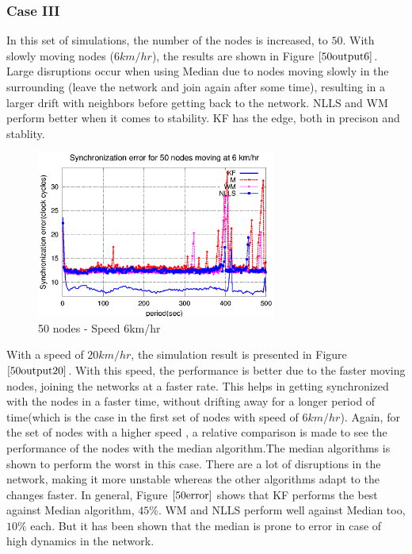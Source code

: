\documentclass[a4paper,10pt]{report}
\begin{document}
\subsubsection{\textbf{Case III}}
In this set of simulations, the number of the nodes is increased, to $50$. With slowly moving nodes ($6km/hr$), the results are shown in Figure $\ref{50output6}$. Large disruptions occur when using Median due to nodes moving slowly in the surrounding (leave the network and join again after some time), resulting in a larger drift with neighbors before getting back to the network. NLLS and WM perform better when it comes to stability. KF has the edge, both in precison and stablity. 
\newline
\begin{figure}
\centering
\includegraphics[width=0.7\textwidth]{50output-s6}
\caption{50 nodes - Speed 6km/hr} \label{50output6}
\end{figure}
With a speed of $20km/hr$, the simulation result is presented in Figure $\ref{50output20}$. With this speed, the performance is
better due to the faster moving nodes, joining the networks at a faster rate. This helps in getting synchronized with the nodes in a
faster time, without drifting away for a longer period of time(which is the case in the first set of nodes with speed of $6km/hr$).
Again, for the set of nodes with a higher speed , a relative comparison is made to see the performance of the nodes with the
median algorithm.\newline The median algorithms is shown to perform the worst in this case. There are a lot of disruptions in the
network, making it more unstable whereas the other algorithms adapt to the changes faster.
\newline In general, Figure $\ref{50error}$ shows that KF performs the best against Median algorithm, $45\%$. WM and NLLS perform well against Median too, $10\%$ each. But it has been shown that the median is prone to error in case of high dynamics in the network.
\end{document}
